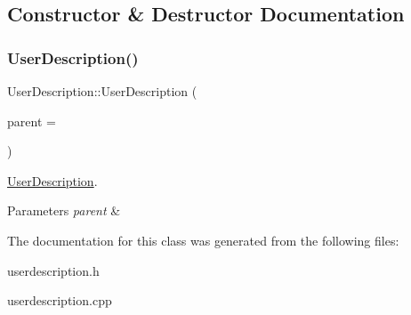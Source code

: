 \subsection{Constructor \& Destructor Documentation}
\mbox{\label{class_user_description_a07117ea9e660fd6ae0a7ecc569edf0f6}} 
\subsubsection{\texorpdfstring{User\+Description()}{UserDescription()}}
{\footnotesize\ttfamily User\+Description\+::\+User\+Description (\begin{DoxyParamCaption}\item[{Q\+Widget $\ast$}]{parent = {} }\end{DoxyParamCaption})\hspace{0.3cm}{\ttfamily [explicit]}}



\hyperlink{class_user_description}{User\+Description}. 


\begin{DoxyParams}{Parameters}
{\em parent} & \\
\hline
\end{DoxyParams}


The documentation for this class was generated from the following files\+:\begin{DoxyCompactItemize}
\item 
userdescription.\+h\item 
userdescription.\+cpp\end{DoxyCompactItemize}
